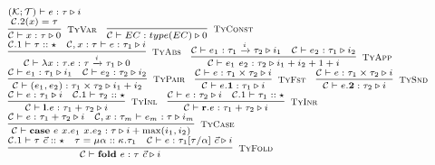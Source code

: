 \documentclass[fleqn]{article}
\begin{document}
\[
\scriptsize
\begin{array}{l}
    (\mathcal{K}; \mathcal{T}) \vdash e : \tau \triangleright i \\
    \infer[\textsc{TyVar}]{\mathcal{C} \vdash x : \tau \triangleright 0}{\mathcal{C}.2(x)=\tau} \hspace{1em}
    \infer[\textsc{TyConst}]{\mathcal{C} \vdash EC : type(EC) \triangleright 0}{} \\
    \infer[\textsc{TyAbs}]{\mathcal{C} \vdash \lambda x:\tau. e : \tau \xrightarrow{i} \tau_1 \triangleright 0}{\mathcal{C}.1 \vdash \tau :: \star & \mathcal{C},x:\tau \vdash e : \tau_1 \triangleright i} \hspace{1em}
    \infer[\textsc{TyApp}]{\mathcal{C} \vdash e_1~e_2 : \tau_2 \triangleright i_1 + i_2 + 1 + i}{\mathcal{C} \vdash e_1 : \tau_1 \xrightarrow{i} \tau_2 \triangleright i_1 & \mathcal{C} \vdash e_2 : \tau_1 \triangleright i_2} \\
    \infer[\textsc{TyPair}]{\mathcal{C} \vdash (e_1,e_2) : \tau_1 \times \tau_2 \triangleright i_1 + i_2}{\mathcal{C} \vdash e_1 : \tau_1 \triangleright i_1 & \mathcal{C} \vdash e_2 : \tau_2 \triangleright i_2} \hspace{1em}
    \infer[\textsc{TyFst}]{\mathcal{C} \vdash e.\mathbf{1} : \tau_1 \triangleright i}{\mathcal{C} \vdash e : \tau_1 \times \tau_2 \triangleright i} \hspace{1em}
    \infer[\textsc{TySnd}]{\mathcal{C} \vdash e.\mathbf{2} : \tau_2 \triangleright i}{\mathcal{C} \vdash e : \tau_1 \times \tau_2 \triangleright i} \\
    \infer[\textsc{TyInl}]{\mathcal{C} \vdash \mathbf{l}.e : \tau_1 + \tau_2 \triangleright i}{\mathcal{C} \vdash e : \tau_1 \triangleright i & \mathcal{C}.1 \vdash \tau_2 :: \star} \hspace{1em}
    \infer[\textsc{TyInr}]{\mathcal{C} \vdash \mathbf{r}.e : \tau_1 + \tau_2 \triangleright i}{\mathcal{C} \vdash e : \tau_2 \triangleright i & \mathcal{C}.1 \vdash \tau_1 :: \star} \\
    \infer[\textsc{TyCase}]{\mathcal{C} \vdash \mathbf{case}~e~x.e_1~x.e_2 : \tau \triangleright i + \max(i_1,i_2)}{\mathcal{C} \vdash e : \tau_1 + \tau_2 \triangleright i & \mathcal{C},x:\tau_m \vdash e_m : \tau \triangleright i_m} \\
    \infer[\textsc{TyFold}]{\mathcal{C} \vdash \mathbf{fold}~e : \tau~\vec{c} \triangleright i}{\mathcal{C}.1 \vdash \tau~\vec{c} :: \star & \tau = \mu \alpha :: \kappa. \tau_1 & \mathcal{C} \vdash e : \tau_1[\tau/\alpha]~\vec{c} \triangleright i} \\

\end{array}\]
\end{document}

